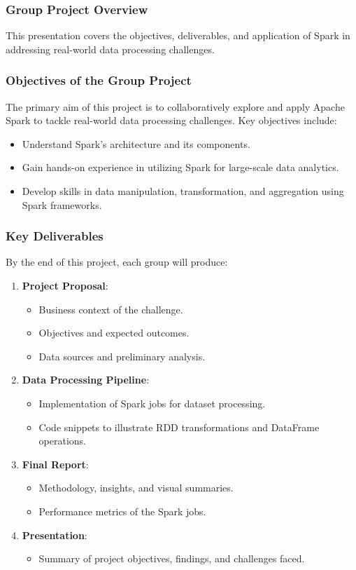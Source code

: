 \documentclass[aspectratio=169]{beamer}
\begin{document}
\begin{frame}
    \frametitle{Group Project Overview}
    This presentation covers the objectives, deliverables, and application of Spark in addressing real-world data processing challenges.
\end{frame}

\begin{frame}
    \frametitle{Objectives of the Group Project}
    The primary aim of this project is to collaboratively explore and apply Apache Spark to tackle real-world data processing challenges. Key objectives include:
    \begin{itemize}
        \item Understand Spark's architecture and its components.
        \item Gain hands-on experience in utilizing Spark for large-scale data analytics.
        \item Develop skills in data manipulation, transformation, and aggregation using Spark frameworks.
    \end{itemize}
\end{frame}

\begin{frame}
    \frametitle{Key Deliverables}
    By the end of this project, each group will produce:
    \begin{enumerate}
        \item \textbf{Project Proposal}:
            \begin{itemize}
                \item Business context of the challenge.
                \item Objectives and expected outcomes.
                \item Data sources and preliminary analysis.
            \end{itemize}
        \item \textbf{Data Processing Pipeline}:
            \begin{itemize}
                \item Implementation of Spark jobs for dataset processing.
                \item Code snippets to illustrate RDD transformations and DataFrame operations.
            \end{itemize}
        \item \textbf{Final Report}:
            \begin{itemize}
                \item Methodology, insights, and visual summaries.
                \item Performance metrics of the Spark jobs.
            \end{itemize}
        \item \textbf{Presentation}:
            \begin{itemize}
                \item Summary of project objectives, findings, and challenges faced.
            \end{itemize}
    \end{enumerate}
\end{frame}
\end{document}
